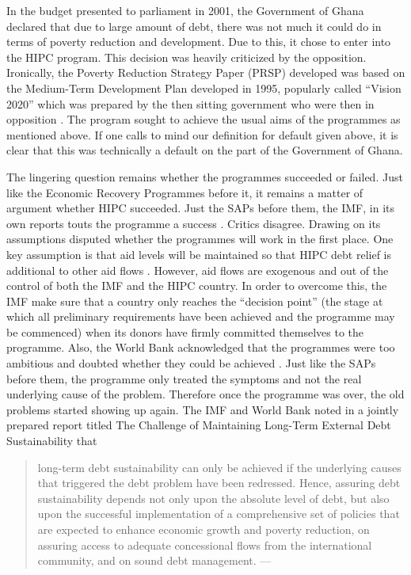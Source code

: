 \documentclass[14pt, a4paper]{article}
\begin{document}
	In the budget presented to parliament in 2001, the Government of Ghana declared that due to large amount of debt, there was not much it could do in terms of poverty reduction and development. Due to this, it chose to enter into the HIPC program. This decision was heavily criticized by the opposition. Ironically, the Poverty Reduction Strategy Paper (PRSP) developed was based on the Medium-Term Development Plan developed in 1995, popularly called ``Vision 2020'' which was prepared by the then sitting government who were then in opposition \cite{osei2001hipc}. The program sought to achieve the usual aims of the programmes as mentioned above. If one calls to mind our definition for default given above, it is clear that this was technically a default on the part of the Government of Ghana.
	
	The lingering question remains whether the programmes succeeded or failed. Just like the Economic Recovery Programmes before it, it remains a matter of argument whether HIPC succeeded. Just the SAPs before them, the IMF, in its own reports touts the programme a success \cite{Debora17}. Critics disagree. Drawing on its assumptions  disputed whether the programmes will work in the first place.  One key assumption  is that aid levels will be maintained so that HIPC debt relief is additional to other aid flows \cite{World2003}. However, aid flows are exogenous and out of the control of both the IMF and the HIPC country. In order to overcome this, the IMF make sure that a country only reaches the ``decision point'' (the stage at which all preliminary requirements have been achieved and the programme may be commenced) when its donors have firmly committed themselves to the programme. Also, the World Bank acknowledged that the programmes were too ambitious and doubted whether they could be achieved \cite{World2003}. Just like the SAPs before them, the programme only treated the symptoms and not the real underlying cause of the problem. Therefore once the programme was over, the old problems started showing up again.
	The IMF and World Bank noted in a jointly prepared report titled The Challenge of Maintaining Long-Term External Debt Sustainability that 
	
	\begin{quotation}
		long-term debt sustainability can only be achieved if the underlying causes that triggered the debt problem have been redressed. Hence, assuring debt sustainability depends not only upon the absolute level of debt, but also upon the successful implementation of a comprehensive set of policies that are expected to enhance economic growth and poverty reduction, on assuring access to adequate concessional flows from the international community, and on sound debt management.
		\hspace{1em plus 1fill}---\cite{THECHALLENGE}
	\end{quotation}
\end{document}
